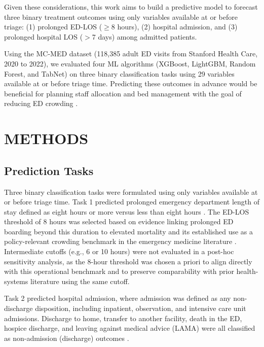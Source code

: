\documentclass[harvard,article]{frontiersinFPHY_FAMS}
\begin{document}
Given these considerations, this work aims to build a predictive model to forecast three binary treatment outcomes using only variables available at or before triage: (1) prolonged ED-LOS ($\geq$8 hours), (2) hospital admission, and (3) prolonged hospital LOS ($>$7 days) among admitted patients.

Using the MC-MED dataset (118,385 adult ED visits from Stanford Health Care, 2020 to 2022), we evaluated four ML algorithms (XGBoost, LightGBM, Random Forest, and TabNet) on three binary classification tasks using 29 variables available at or before triage time. Predicting these outcomes in advance would be beneficial for planning staff allocation and bed management with the goal of reducing ED crowding \cite{moreno2024, canellas2024}.

\section{METHODS}

\subsection{Prediction Tasks}

Three binary classification tasks were formulated using only variables available at or before triage time. Task 1 predicted prolonged emergency department length of stay defined as eight hours or more versus less than eight hours \cite{sun2013, farimani2024}. The ED-LOS threshold of 8 hours was selected based on evidence linking prolonged ED boarding beyond this duration to elevated mortality \cite{sun2013} and its established use as a policy-relevant crowding benchmark in the emergency medicine literature \cite{boyle2012, morley2018}. Intermediate cutoffs (e.g., 6 or 10 hours) were not evaluated in a post-hoc sensitivity analysis, as the 8-hour threshold was chosen a priori to align directly with this operational benchmark and to preserve comparability with prior health-systems literature using the same cutoff.

Task 2 predicted hospital admission, where admission was defined as any non-discharge disposition, including inpatient, observation, and intensive care unit admissions. Discharge to home, transfer to another facility, death in the ED, hospice discharge, and leaving against medical advice (LAMA) were all classified as non-admission (discharge) outcomes \cite{kansal2025, fenn2021}.
\end{document}
